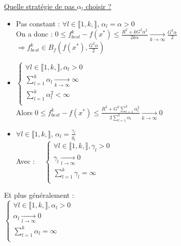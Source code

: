 \documentclass[12pt,a4paper]{article}
\begin{document}
\noindent \underline{Quelle stratégie de pas $\alpha_l$ choisir ?}
\begin{itemize}
    \item Pas constant : $\forall l \in \llbracket 1, k, \rrbracket$, $\alpha_l = \alpha > 0$\\
    
    On a donc : $0 \leq f^k_{best} - f(x^*) \leq \frac{R^2 + kG^2 \alpha^2}{2 k \alpha} \xrightarrow[k \rightarrow \infty]{} \frac{G^2 \alpha}{2}$\\
    $\Rightarrow f^k_{best} \in B_f(f(x^*), \frac{G^2 \alpha}{2})$\\

    \item $\begin{cases}
        \forall l \in \llbracket 1, k, \rrbracket, \alpha_l > 0\\
        \sum_{l=1}^k \alpha_l \xrightarrow[k \rightarrow \infty]{} \infty\\
        \sum_{l=1}^k \alpha_l^2 < \infty\\
    \end{cases}$\\
    Alors $0 \leq f^k_{best} - f(x^*) \leq \frac{R^2 + G^2 \sum_{l=1}^k \alpha_l^2}{2 \sum_{l=1}^k \alpha_l} \xrightarrow[k \rightarrow \infty]{} 0$\\
    
    
    \item $\forall l \in \llbracket 1, k, \rrbracket$, $\alpha_l = \frac{\gamma_l}{g_l}$\\
    Avec : $\quad \begin{cases}
        \forall l \in \llbracket 1, k, \rrbracket, \gamma_l > 0\\
        \gamma_l \xrightarrow[l \rightarrow \infty]{} 0\\
        \sum_{l=1}^k \gamma_l = \infty\\
    \end{cases}$
\end{itemize}

\noindent Et plus généralement :\\
$\begin{cases}
    \forall l \in \llbracket 1, k, \rrbracket, \alpha_l > 0\\
    \alpha_l \xrightarrow[l \rightarrow \infty]{} 0\\
    \sum_{l=1}^k \alpha_l = \infty\\
\end{cases}$
\end{document}
